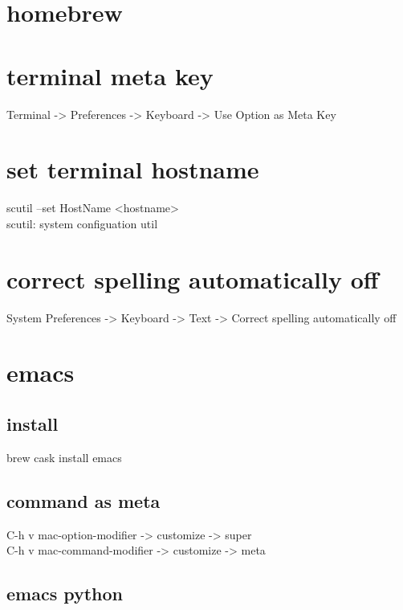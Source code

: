 \documentclass[11pt]{article}
\author{Hack Chyson}
\date{\today}
\title{}
\begin{document}
\tableofcontents

\section{homebrew}
\label{sec:orgb1d7bfb}

\section{terminal meta key}
\label{sec:org7c79cb4}
Terminal -> Preferences -> Keyboard -> Use Option as Meta Key\\

\section{set terminal hostname}
\label{sec:org337f91d}
scutil --set HostName <hostname>\\

scutil: system configuation util\\

\section{correct spelling automatically off}
\label{sec:orgede9701}
System Preferences -> Keyboard -> Text -> Correct spelling automatically off\\


\section{emacs}
\label{sec:org020ec9f}
\subsection{install}
\label{sec:org0f94be2}
brew cask install emacs\\
\subsection{command as meta}
\label{sec:org14edf17}
C-h v mac-option-modifier -> customize -> super\\
C-h v mac-command-modifier -> customize -> meta\\



\subsection{emacs python}
\label{sec:org6908162}
\end{document}

